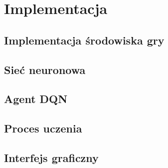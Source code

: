 \section{Implementacja}
\label{sec:implementacja}

\subsection{Implementacja środowiska gry}
\subsection{Sieć neuronowa}
\subsection{Agent DQN}
\subsection{Proces uczenia}
\subsection{Interfejs graficzny}